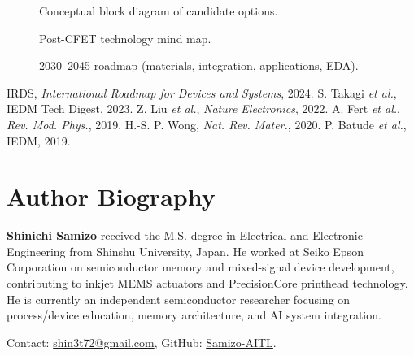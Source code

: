 \documentclass[conference]{IEEEtran}
\newcommand{\figpath}{figures}
\newcommand{\tikzcol}[2][\linewidth]{\resizebox{#1}{!}{}}
\newcommand{\etal}{\textit{et al.}}
\begin{document}
\FloatBarrier
\begin{figure*}[!t]
  \centering
  \tikzcol[0.95\textwidth]{\figpath/block_diagram.tex}
  \caption{Conceptual block diagram of candidate options.}
\end{figure*}

\begin{figure*}[!t]
  \centering
  \tikzcol[0.95\textwidth]{\figpath/mindmap.tex}
  \caption{Post-CFET technology mind map.}
\end{figure*}

\begin{figure*}[!t]
  \centering
  \tikzcol[0.95\textwidth]{\figpath/roadmap.tex}
  \caption{2030--2045 roadmap (materials, integration, applications, EDA).}
\end{figure*}

\begin{thebibliography}{1}
 IRDS, \emph{International Roadmap for Devices and Systems}, 2024.
 S. Takagi \etal, IEDM Tech Digest, 2023.
 Z. Liu \etal, \emph{Nature Electronics}, 2022.
 A. Fert \etal, \emph{Rev. Mod. Phys.}, 2019.
 H.-S. P. Wong, \emph{Nat. Rev. Mater.}, 2020.
 P. Batude \etal, IEDM, 2019.
\end{thebibliography}

\section*{Author Biography}
\textbf{Shinichi Samizo} received the M.S. degree in Electrical and Electronic Engineering from Shinshu University, Japan.  
He worked at Seiko Epson Corporation on semiconductor memory and mixed-signal device development, contributing to inkjet MEMS actuators and PrecisionCore printhead technology.  
He is currently an independent semiconductor researcher focusing on process/device education, memory architecture, and AI system integration.  
\par\smallskip Contact: \href{mailto:shin3t72@gmail.com}{shin3t72@gmail.com}, GitHub: \href{https://github.com/Samizo-AITL}{Samizo-AITL}.
\end{document}
